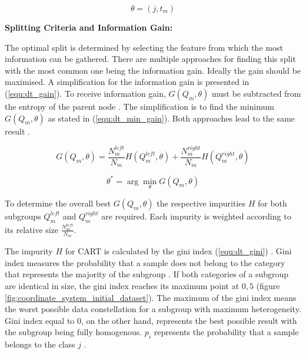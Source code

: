 \begin{equation}
    \theta = (j, t_{m})
    \label{equ:dt_split}
\end{equation}

\textbf{Splitting Criteria and Information Gain:}

The optimal split is determined by selecting the feature from which the most information can be gathered. There are multiple approaches 
for finding this split with the most common one being the information gain. Ideally the gain should be maximised. A simplification 
for the information gain is presented in (\ref{equ:dt_gain}). To receive information gain, \(G(Q_{m}, \theta)\) must be subtracted from 
the entropy of the parent node \cite[p.613f]{tangirala2020evaluating}. The simplification is to find the minimum \(G(Q_{m}, \theta)\) as stated in (\ref{equ:dt_min_gain}). Both
approaches lead to the same result \cite{scikit-decision_tree}. 

\begin{equation}
    G(Q_{m},\theta) = \frac{N^{left}_{m}}{N_{m}} H(Q^{left}_{m}, \theta ) + \frac{N^{right}_{m}}{N_{m}} H(Q^{right}_{m}, \theta )
    \label{equ:dt_gain}
\end{equation}

\begin{equation}
    \theta ^* = \arg \min_{\theta}  G(Q_{m}, \theta)
    \label{equ:dt_min_gain}
\end{equation}

To determine the overall best \(G(Q_{m}, \theta)\) the respective impurities \(H\) for both subgroups \(Q^{left}_{m}\) 
and \(Q^{right}_{m}\) are required. Each impurity is weighted according to its relative size 
\(\frac{N^{left}_{m}}{N_{m}}\).

The impurity \(H\) for \ac{CART} is calculated by the gini index (\ref{equ:dt_gini}) \cite[p.613f]{tangirala2020evaluating}. Gini index measures the probability that a sample 
does not belong to the category that represents the majority of the subgroup \cite[p.335]{James2021}. If both 
categories of a subgroup are identical in size, the gini index reaches its maximum point at \(0,5\) (figure \ref{fig:coordinate_system_initial_dataset}). The 
maximum of the gini index means the worst possible data constellation for a subgroup with maximum heterogeneity. 
Gini index equal to \(0\), on the other hand, represents the best possible result with the subgroup being fully 
homogenous. \(p_{i}\) represents the probability that a sample belongs to the class \(j\) \cite[p.335]{James2021}.

